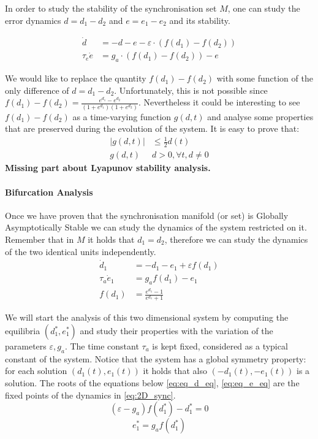 In order to study the stability of the synchronisation set $M$, one can study the error dynamics $d=d_1 - d_2$ and $e= e_1 - e_2$ and its stability. 

\begin{equation} 
\begin{aligned}
\dot d &= -d - e - \varepsilon \cdot (f(d_1) - f(d_2)) \\
\tau_e \dot e &= g_a \cdot (f(d_1) - f(d_2)) - e
\end{aligned}
\end{equation}


 We would like to replace the quantity $f(d_1) - f(d_2)$ with some function of the only difference of $d=d_1-d_2$. Unfortunately, this is not possible since $f(d_1)-f(d_2) = \frac{e^{d_1}-e^{d_2}}{(1+e^{d_1})(1+e^{d_2})}$. Nevertheless it could be interesting to see $f(d_1)-f(d_2)$ as a time-varying function $g(d, t)$ and analyse some properties that are preserved during the evolution of the system.
It is easy to prove that:
\begin{equation}
\begin{aligned}
|g(d,t)| &\leq \frac{1}{2}d(t) \\
g(d,t)&d>0, \forall t, d\neq0
\end{aligned}
\end{equation}
\textbf{Missing part about Lyapunov stability analysis.}

\paragraph{Bifurcation Analysis}
Once we have proven that the synchronisation manifold (or set) is Globally Asymptotically Stable we can study the dynamics of the system restricted on it. Remember that in $M$ it holds that $d_1=d_2$, therefore we can study the dynamics of the two identical units independently.  
\begin{equation}
\begin{aligned}
\dot d_{1} &= - d_1 - e_1 + \varepsilon f(d_1) \\
\tau_a \dot{e}_{1}&=g_a f(d_1) - e_{1}\\
f(d_1) &= \frac{e^{d_1}-1}{e^{d_1}+1}
\end{aligned}
\label{eq:2D_sync}
\end{equation}

We will start the analysis of this two dimensional system by computing the equilibria $(d_1^*,e_1^*)$ and study their properties with the variation of the parameters $\varepsilon, g_a$. The time constant $\tau_a$ is kept fixed, considered as a typical constant of the system. Notice that the system has a global symmetry property: for each solution $(d_1(t), e_1(t))$ it holds that also $(-d_1(t), -e_1(t))$ is a solution. The roots of the equations below \eqref{eq:eq_d_eq}, \eqref{eq:eq_e_eq}  are the fixed points of the dynamics in \eqref{eq:2D_sync}.
\begin{equation}
 (\varepsilon - g_a)f(d_1^*) - d_1^* = 0
\label{eq:eq_d_eq}
\end{equation}
\begin{equation}
e_1^* = g_a f(d_1^*)
\label{eq:eq_e_eq}
\end{equation}

